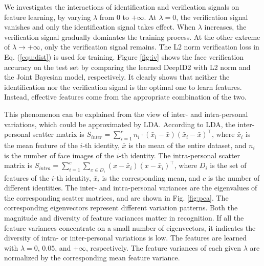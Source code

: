 \documentclass{article} %
\begin{document}
We investigates the interactions of identification and verification signals on feature learning, by varying $\lambda$ from $0$ to $+\infty$. At $\lambda=0$, the verification signal vanishes  and only the identification signal takes effect. When $\lambda$ increases, the verification signal gradually dominates the training process. At the other extreme of $\lambda\to +\infty$, only the verification signal remains. The L2 norm verification loss in Eq. (\ref{equ:dist}) is used for training. Figure \ref{fig:iv} shows the face verification accuracy on the test set by comparing the learned DeepID2 with L2 norm and the Joint Bayesian model, respectively. It clearly shows that neither the identification nor the verification signal is the optimal one to learn features. Instead, effective features come from the appropriate combination of the two.

This phenomenon can be explained from the view of inter- and intra-personal variations, which could be approximated by LDA.
According to LDA, the inter-personal scatter matrix is $S_{inter}=\sum_{i=1}^c n_i\cdot\left(\bar{x}_i-\bar{x}\right)\left(\bar{x}_i-\bar{x}\right)^\top$, where $\bar{x}_i$ is the mean feature of the $i$-th identity, $\bar{x}$ is the mean of the entire dataset, and $n_i$ is the number of face images of the $i$-th identity. The intra-personal scatter matrix is $S_{intra}=\sum_{i=1}^c\sum_{x\in D_i}\left(x-\bar{x}_i\right)\left(x-\bar{x}_i\right)^\top$, where $D_i$ is the set of features of the $i$-th identity, $\bar{x}_i$ is the corresponding mean, and $c$ is the number of different identities. The inter- and intra-personal variances are the eigenvalues of the corresponding scatter matrices, and are shown in Fig. \ref{fig:pca}. The corresponding eigenvectors represent different variation patterns.
Both the magnitude and diversity of feature variances matter in recognition. If all the feature variances concentrate on a small number of eigenvectors, it indicates the diversity of intra- or inter-personal variations is low.
The features are learned with $\lambda=0$, $0.05$, and $+\infty$, respectively.
The feature variances of each given $\lambda$ are normalized by the corresponding mean feature variance.
\end{document}
